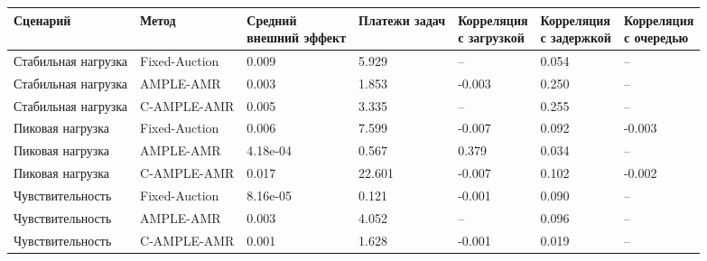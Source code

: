 \begin{tabular}{lllllll}
\toprule
 Сценарий & Метод & \shortstack{Средний\\внешний эффект} & Платежи задач & \shortstack{Корреляция\\с загрузкой} & \shortstack{Корреляция\\с задержкой} & \shortstack{Корреляция\\с очередью} \\
\midrule
 Стабильная нагрузка & Fixed-Auction & 0.009 & 5.929 & -- & 0.054 & -- \\
 Стабильная нагрузка & AMPLE-AMR & 0.003 & 1.853 & -0.003 & 0.250 & -- \\
 Стабильная нагрузка & C-AMPLE-AMR & 0.005 & 3.335 & -- & 0.255 & -- \\
 Пиковая нагрузка & Fixed-Auction & 0.006 & 7.599 & -0.007 & 0.092 & -0.003 \\
 Пиковая нагрузка & AMPLE-AMR & 4.18e-04 & 0.567 & 0.379 & 0.034 & -- \\
 Пиковая нагрузка & C-AMPLE-AMR & 0.017 & 22.601 & -0.007 & 0.102 & -0.002 \\
 Чувствительность & Fixed-Auction & 8.16e-05 & 0.121 & -0.001 & 0.090 & -- \\
 Чувствительность & AMPLE-AMR & 0.003 & 4.052 & -- & 0.096 & -- \\
 Чувствительность & C-AMPLE-AMR & 0.001 & 1.628 & -0.001 & 0.019 & -- \\
\bottomrule
\end{tabular}
